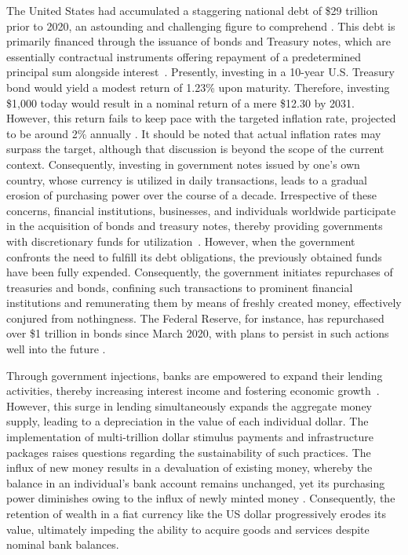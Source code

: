 The United States had accumulated a staggering national debt of \$29 trillion prior to 2020, an astounding and challenging figure to comprehend
\cite{usdebt}. This debt is primarily financed through the issuance of bonds and Treasury notes, which are essentially contractual instruments
offering repayment of a predetermined principal sum alongside interest~\cite{treasurysecurities}. Presently, investing in a 10-year U.S.
Treasury bond would yield a modest return of 1.23\% upon maturity. Therefore, investing \$1,000 today would result in a nominal return of a
mere \$12.30 by 2031. However, this return fails to keep pace with the targeted inflation rate, projected to be around 2\% annually
\cite{frbinflation}. It should be noted that actual inflation rates may surpass the target, although that discussion is beyond the scope of the
current context. Consequently, investing in government notes issued by one's own country, whose currency is utilized in daily transactions,
leads to a gradual erosion of purchasing power over the course of a decade. Irrespective of these concerns, financial institutions, businesses,
and individuals worldwide participate in the acquisition of bonds and treasury notes, thereby providing governments with discretionary funds
for utilization~\cite{treasurysecurities}. However, when the government confronts the need to fulfill its debt obligations, the previously
obtained funds have been fully expended. Consequently, the government initiates repurchases of treasuries and bonds, confining such transactions
to prominent financial institutions and remunerating them by means of freshly created money, effectively conjured from nothingness. The Federal
Reserve, for instance, has repurchased over \$1 trillion in bonds since March 2020, with plans to persist in such actions well into the future
\cite{federalreserve}.

Through government injections, banks are empowered to expand their lending activities, thereby increasing interest income and fostering
economic growth~\cite{federalreserve}. However, this surge in lending simultaneously expands the aggregate money supply, leading to a depreciation
in the value of each individual dollar. The implementation of multi-trillion dollar stimulus payments and infrastructure packages raises questions
regarding the sustainability of such practices. The influx of new money results in a devaluation of existing money, whereby the balance in an
individual's bank account remains unchanged, yet its purchasing power diminishes owing to the influx of newly minted money
\cite{currencydevaluation}. Consequently, the retention of wealth in a fiat currency like the US dollar progressively erodes its value,
ultimately impeding the ability to acquire goods and services despite nominal bank balances.

